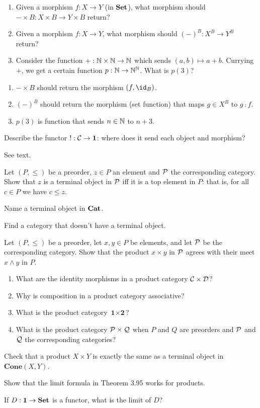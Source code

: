 \begin{enumerate}
	\item Given a morphism $f:X\to Y$ (in $\textbf{Set}$), what morphism should $-\times B:X\times B\to Y\times B$ return?
	\item Given a morphism $f:X\to Y$, what morphism should $(-)^B:X^B\to Y^B$ return?
	\item Consider the function $+:\mathbb{N}\times\mathbb{N}\to\mathbb{N}$ which sends $(a,b)\mapsto a+b$.  Currying $+$, we get a certain function $p:\mathbb{N}\to\mathbb{N}^{\mathbb{N}}$.  What is $p(3)$?
\end{enumerate}

\solution
\begin{enumerate}
	\item $-\times B$ should return the morphism $(f,\id_B)$.
	\item $(-)^B$ should return the morphism (set function) that maps $g\in X^B$ to $g\fcmp f$.
	\item $p(3)$ is function that sends $n\in\mathbb{N}$ to $n+3$.
\end{enumerate}

Describe the functor $!:\mathcal{C}\to\textbf{1}$: where does it send each object and morphism?


See text.


Let $(P,\leq)$ be a preorder, $z\in P$ an element and $\mathcal{P}$ the corresponding category.  Show that $z$ is a terminal object in $\mathcal{P}$ iff it is a top element in $P$: that is, for all $c\in P$ we have $c\leq z$.


Name a terminal object in $\textbf{Cat}$.


Find a category that doesn't have a terminal object.


Let $(P,\leq)$ be a preorder, let $x,y\in P$ be elements, and let $\mathcal{P}$ be the corresponding category.  Show that the product $x\times y$ in $\mathcal{P}$ agrees with their meet $x\land y$ in $P$.


\begin{enumerate}
	\item What are the identity morphisms in a product category $\mathcal{C}\times\mathcal{D}$?
	\item Why is composition in a product category associative?
	\item What is the product category $\textbf{1}\times\textbf{2}$?
	\item What is the product category $\mathcal{P}\times\mathcal{Q}$ when $P$ and $Q$ are preorders and $\mathcal{P}$ and $\mathcal{Q}$ the corresponding categories?
\end{enumerate}


Check that a product $X\times Y$ is exactly the same as a terminal object in $\textbf{Cone}(X,Y)$.


Show that the limit formula in Theorem 3.95 works for products.


If $D:\textbf{1}\to\textbf{Set}$ is a functor, what is the limit of $D$?




